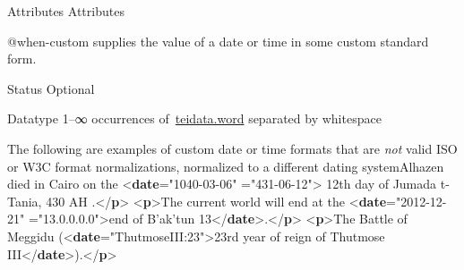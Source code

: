 \begin{reflist}
    \item[{Attributes}]
  Attributes\hfil\\[-10pt]\begin{sansreflist}
    \item[@when-custom]
  supplies the value of a date or time in some custom standard form.
\begin{reflist}
    \item[{Status}]
  Optional
    \item[{Datatype}]
  1–∞ occurrences of \hyperref[TEI.teidata.word]{teidata.word} separated by whitespace
    \item[]The following are examples of custom date or time formats that are \textit{not} valid ISO or W3C format normalizations, normalized to a different dating systemAlhazen died in Cairo on the\mbox{}\newline 
{<\textbf{date}\hspace*{1em}{when}="{1040-03-06}"\mbox{}\newline 
\hspace*{1em}\hspace*{1em}{when-custom}="{431-06-12}">} 12th day of Jumada t-Tania, 430 AH\mbox{}\newline 
{}.{</\textbf{p}>}\mbox{}\newline 
{<\textbf{p}>}The current world will end at the\mbox{}\newline 
{<\textbf{date}\hspace*{1em}{when}="{2012-12-21}"\mbox{}\newline 
\hspace*{1em}\hspace*{1em}{when-custom}="{13.0.0.0.0}">}end of B'ak'tun 13{</\textbf{date}>}.{</\textbf{p}>}\mbox{}\newline 
{<\textbf{p}>}The Battle of Meggidu\mbox{}\newline 
 ({<\textbf{date}\hspace*{1em}{when-custom}="{Thutmose\textunderscore III:23}">}23rd year of reign of Thutmose III{</\textbf{date}>}).{</\textbf{p}>}\mbox{}\newline 

\end{reflist}
\end{sansreflist}
\end{reflist}
